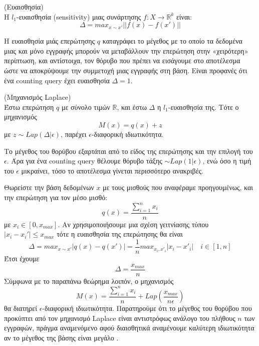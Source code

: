 \begin{definition}(Ευαισθησία)\\
 Η $l_1$-ευαισθησία (\textlatin{sensitivity}) μιας συνάρτησης $f:X \longrightarrow \mathbb{R}^k$ είναι:
$$\Delta=max_{x\sim x'}||f(x)-f(x')||$$
\end{definition}
Η ευαισθησία μιάς επερώτησης $q$ καταγράφει το μέγεθος με το οποίο τα δεδομένα μιας και μόνο εγγραφής μπορούν να μεταβάλλουν την επερώτηση στην «χειρότερη» περίπτωση, και αντίστοιχα, τον θόρυβο που πρέπει να εισάγουμε στο αποτέλεσμα ώστε να αποκρύψουμε την συμμετοχή μιας εγγραφής στη βάση. 
Είναι προφανές ότι ένα \textlatin{counting query} έχει ευαισθησία $\Delta=1$.


\begin{theorem}(Μηχανισμός \textlatin{Laplace})\\
Έστω επερώτηση $q$ με σύνολο τιμών $\mathbb{R}$, και έστω $\Delta$ η $l_1$-ευαισθησία της. Τότε ο μηχανισμός 
$$M(x) = q(x) + z$$
με $z\sim Lap(\Delta|\epsilon)$, παρέχει $\epsilon$-διαφορική ιδιωτικότητα.
\end{theorem}

Το μέγεθος του θορύβου εξαρτάται από το είδος της επερώτησης και την επιλογή του $\epsilon$. Άρα για ένα \textlatin{counting query} θέλουμε θόρυβο τάξης $\sim Lap(1|\epsilon)$, ενώ όσο η τιμή του $\epsilon$ μικραίνει, τόσο το αποτέλεσμα γίνεται περισσότερο ανακριβές.

Θωρείστε την βάση δεδομένων $x$ με τους μισθούς που αναφέραμε προηγουμένως, και την επερώτηση για τον μέσο μισθό:
$$q(x)=\frac{\sum_{i=1}^{n}x_i}{n}$$
με $x_i\in [0,x_{max}]$. Αν χρησιμοποιήσουμε μια σχέση γειτνίασης τύπου $|x_i - x_i'|\leq x_{max}$ τότε η ευαισθησία της επερώτησης θα είναι 
$$\Delta=max_{x\sim x'}|q(x)-q(x')|=\frac{1}{n}max_{x_i,x'_i}|x_i - x'_i|\quad  i \in [1,n]$$ Έτσι έχουμε
$$\Delta=\frac{x_{max}}{n}$$
Σύμφωνα με το παραπάνω θεώρημα λοιπόν, ο μηχανισμός
$$M(x)=\frac{\sum_{i=1}^{n}x_i}{n}+Lap(\frac{x_{max}}{n\epsilon})$$
θα διατηρεί $\epsilon$-διαφορική ιδιωτικότητα.
Παρατηρούμε ότι το μέγεθος του θορύβου που προκύπτει από τον μηχανισμό \textlatin{Laplace} είναι αντιστρόφως ανάλογο του πλήθους $n$ των εγγραφών, πράγμα αναμενόμενο αφού διαισθητικά αναμένουμε καλύτερη ιδιωτικότητα αν το μέγεθος της βάσης είναι μεγάλο \textlatin{\cite{Corts2016DifferentialPI}}.

















